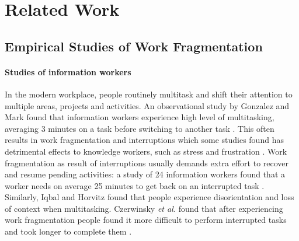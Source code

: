 \documentclass[conference]{IEEEtran}
\newcommand{\etal}{\textit{et al.}\xspace}
\begin{document}

\section{Related Work}

\subsection{Empirical Studies of Work Fragmentation}

\paragraph{Studies of information workers}
In the modern workplace, people routinely multitask and shift their attention to multiple areas, projects and activities. An observational study by Gonzalez and Mark found that information workers experience high level of multitasking, averaging 3 minutes on a task before switching to another task \cite{GM04}. This often results in work fragmentation and interruptions which some studies found has detrimental effects to knowledge workers, such as stress and frustration \cite{MGK08}. Work fragmentation as result of interruptions usually demands extra effort to recover and resume pending activities: a study of 24 information workers found that a worker needs on average 25 minutes to get back on an interrupted task \cite{MGH05}. Similarly, Iqbal and Horvitz \cite{IH07} found that people experience disorientation and loss of context when multitasking. Czerwinsky \etal found that after experiencing work fragmentation people found it more difficult to perform interrupted tasks and took longer to complete them \cite{CHW04}. %
\end{document}

